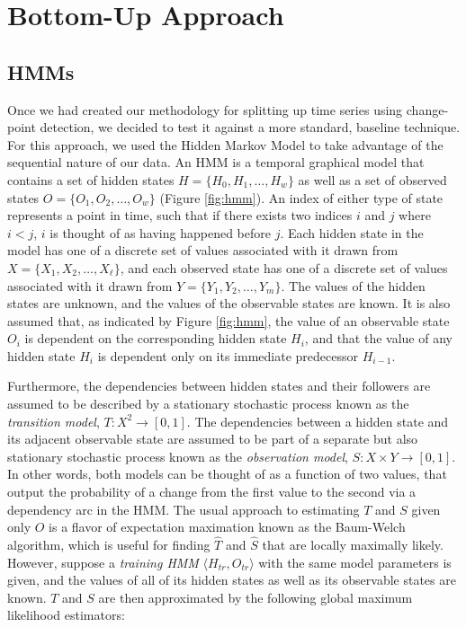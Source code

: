 \section{Bottom-Up Approach}
\label{sec:bottomup}

\subsection{HMMs}

Once we had created our methodology for splitting up time series using change-
point detection, we decided to test it against a more standard,
baseline technique. For this approach, we used the Hidden Markov Model to take
advantage of the sequential nature of our data. An HMM is a temporal graphical model
that contains a set of hidden states $H = \{H_0,H_1, \ldots, H_w\}$ as well as a set of
observed states $O = \{O_1,O_2, \ldots, O_w\}$ (Figure \ref{fig:hmm}). An index
of either type of state represents a point in time, such that if there exists
two indices $i$ and $j$ where $i < j$, $i$ is thought of as having happened
before $j$. Each hidden state in the model has one of a discrete set of values associated
with it drawn from $X=\{X_1,X_2, \ldots, X_{\ell}\}$, and each observed state has one
of a discrete set of values associated with it drawn from $Y=\{Y_1,Y_2, \ldots, Y_m\}$.
The values of the hidden states are unknown, and the values of the observable
states are known.
It is also assumed that, as indicated by Figure \ref{fig:hmm}, the
value of an observable state $O_i$ is dependent on the corresponding
hidden state $H_i$, and that the value of any hidden state $H_i$ is dependent only on
its immediate predecessor $H_{i-1}$.

Furthermore, the dependencies between hidden states and their followers are
assumed to be described by a stationary stochastic process known as the
\emph{transition model}, \mbox{$T: X^2 \rightarrow [0,1]$}. The dependencies
between a hidden state and its adjacent observable state are assumed to be part
of a separate but also stationary stochastic process known as the
\emph{observation model}, $S: X \times Y \rightarrow [0,1]$. In other words, both
models can be thought of as a function of two values, that output the
probability of a change from the first value to the second via a dependency
arc in the HMM. The usual approach to estimating $T$ and $S$ given only
$O$ is a flavor of expectation maximation known as the Baum-Welch algorithm,
which is useful for finding $\hat{T}$ and $\hat{S}$ that are locally maximally
likely. However, suppose a \emph{training HMM} $\langle H_{tr},O_{tr} \rangle$
with the same model parameters is given, and the values of all of its hidden states as well as its
observable states are known. $T$ and $S$ are then approximated by the
following global maximum likelihood estimators:

